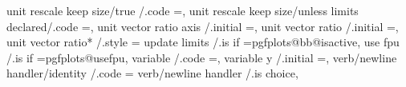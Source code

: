 {{{{{{{{{{{{{{{{{{{{{{{{{{{{{{{{{{{{{{{{{{{{{{{{{{{{{{{{{{{{{{{{{{unit rescale keep size/true                  /.code                                                                                    ={\def\pgfplots@unit@vector@rescale@keep@size{1}},                                                                  
unit rescale keep size/unless limits declared/.code                                                                                    ={\def\pgfplots@unit@vector@rescale@keep@size{2}},                                                                  
unit vector ratio axis                       /.initial                                                                                 =,%
unit vector ratio                            /.initial                                                                                 =,%
unit vector ratio*                           /.style                                                                                   ={%
update limits                                /.is if                                                                                   =pgfplots@bb@isactive,                                                                                              
use fpu                                      /.is if                                                                                   =pgfplots@usefpu,                                                                                                   
variable                                     /.code                                                                                    ={},       
variable y                                   /.initial                                                                                 =\y,%
verb/newline handler/identity                /.code                                                                                    =                                                                                                                   
verb/newline handler                         /.is choice,                                                                        
}}}}}}}}}}}}}}}}}}}}}}}}}}}}}}}}}}}}}}}}}}}}}}}}}}}}}}}}}}}}}}}}}}}
